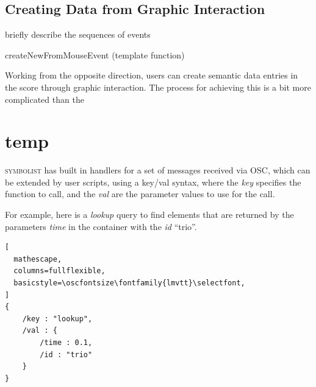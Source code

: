 \documentclass{article}
\def\symbolist{\textsc{symbolist}\xspace}
\def\oscfontsize{\footnotesize}
\begin{document}
\subsection{Creating Data from Graphic Interaction}

briefly describe the sequences of events
 

createNewFromMouseEvent (template function)

Working from the opposite direction, users can create semantic data entries in the score through graphic interaction. The process for achieving this is a bit more complicated than the 



\section{temp}

\symbolist has built in handlers for a set of messages received via OSC, which can be extended by user scripts, using a key/val syntax, where the \textit{key} specifies the function to call, and the \textit{val} are the parameter values to use for the call.

For example, here is a \textit{lookup} query to find elements that are returned by the parameters \textit{time} in the container with the \textit{id} ``trio''.


\begin{lstlisting}[
  mathescape,
  columns=fullflexible,
  basicstyle=\oscfontsize\fontfamily{lmvtt}\selectfont,
]
{
    /key : "lookup",
    /val : {
        /time : 0.1,
        /id : "trio"
    }
}

\end{lstlisting}
\end{document}
